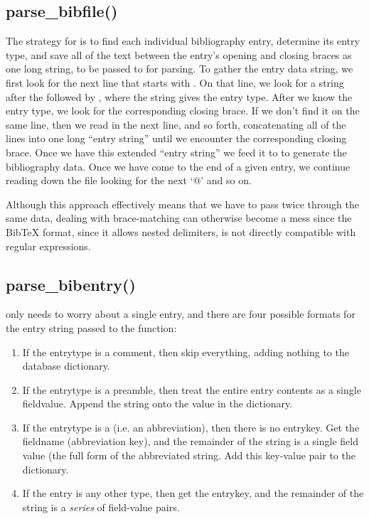 \documentclass[letterpaper,10pt,english]{sphinxmanual}
\begin{document}
\subsection{parse\_bibfile()}
\label{developer_guide:parse-bibfile}
The strategy for  is to find each individual bibliography entry, determine its entry type, and save all of the text between the entry's opening and closing braces as one long string, to be passed to  for parsing. To gather the entry data string, we first look for the next line that starts with . On that line, we look for a string after the  followed by \code{\{}, where the string gives the entry type. After we know the entry type, we look for the corresponding closing brace. If we don't find it on the same line, then we read in the next line, and so forth, concatenating all of the lines into one long ``entry string'' until we encounter the corresponding closing brace. Once we have this extended ``entry string'' we feed it to  to generate the bibliography data. Once we have come to the end of a given entry, we continue reading down the file looking for the next `@' and so on.

Although this approach effectively means that we have to pass twice through the same data, dealing with brace-matching can otherwise become a mess since the BibTeX format, since it allows nested delimiters, is not directly compatible with regular expressions.


\subsection{parse\_bibentry()}
\label{developer_guide:parse-bibentry}
 only needs to worry about a single entry, and there are four possible formats for the entry string passed to the function:
\begin{enumerate}
\item {} 
If the entrytype is a comment, then skip everything, adding nothing to the database dictionary.

\item {} 
If the entrytype is a preamble, then treat the entire entry contents as a single fieldvalue. Append the string onto the  value in the  dictionary.

\item {} 
If the entrytype is a  (i.e. an abbreviation), then there is no entrykey. Get the fieldname (abbreviation key), and the remainder of the string is a single field value (the full form of the abbreviated string. Add this key-value pair to the  dictionary.

\item {} 
If the entry is any other type, then get the entrykey, and the remainder of the string is a \emph{series} of field-value pairs.

\end{enumerate}
\end{document}
